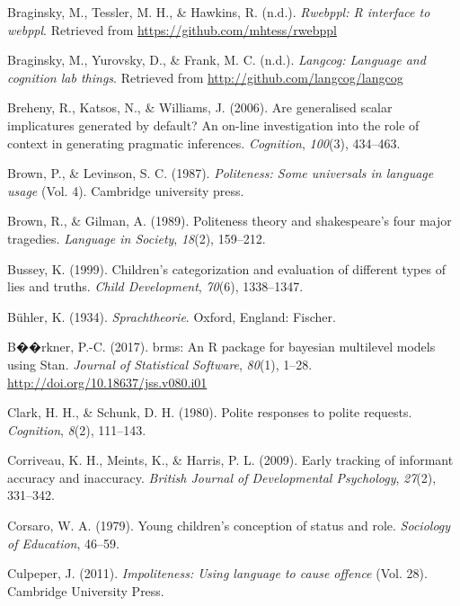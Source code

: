 \documentclass[oneside]{report}
\begin{document}
\hypertarget{ref-R-rwebppl}{}
Braginsky, M., Tessler, M. H., \& Hawkins, R. (n.d.). \emph{Rwebppl: R
interface to webppl}. Retrieved from
\url{https://github.com/mhtess/rwebppl}

\hypertarget{ref-R-langcog}{}
Braginsky, M., Yurovsky, D., \& Frank, M. C. (n.d.). \emph{Langcog:
Language and cognition lab things}. Retrieved from
\url{http://github.com/langcog/langcog}

\hypertarget{ref-breheny2006}{}
Breheny, R., Katsos, N., \& Williams, J. (2006). Are generalised scalar
implicatures generated by default? An on-line investigation into the
role of context in generating pragmatic inferences. \emph{Cognition},
\emph{100}(3), 434--463.

\hypertarget{ref-brown1987}{}
Brown, P., \& Levinson, S. C. (1987). \emph{Politeness: Some universals
in language usage} (Vol. 4). Cambridge university press.

\hypertarget{ref-brown1989}{}
Brown, R., \& Gilman, A. (1989). Politeness theory and shakespeare's
four major tragedies. \emph{Language in Society}, \emph{18}(2),
159--212.

\hypertarget{ref-bussey1999}{}
Bussey, K. (1999). Children's categorization and evaluation of different
types of lies and truths. \emph{Child Development}, \emph{70}(6),
1338--1347.

\hypertarget{ref-buhler1934}{}
Bühler, K. (1934). \emph{Sprachtheorie}. Oxford, England: Fischer.

\hypertarget{ref-R-brms}{}
B��rkner, P.-C. (2017). brms: An R package for bayesian multilevel
models using Stan. \emph{Journal of Statistical Software}, \emph{80}(1),
1--28. \url{http://doi.org/10.18637/jss.v080.i01}

\hypertarget{ref-clark1980}{}
Clark, H. H., \& Schunk, D. H. (1980). Polite responses to polite
requests. \emph{Cognition}, \emph{8}(2), 111--143.

\hypertarget{ref-corriveau2009}{}
Corriveau, K. H., Meints, K., \& Harris, P. L. (2009). Early tracking of
informant accuracy and inaccuracy. \emph{British Journal of
Developmental Psychology}, \emph{27}(2), 331--342.

\hypertarget{ref-corsaro1979}{}
Corsaro, W. A. (1979). Young children's conception of status and role.
\emph{Sociology of Education}, 46--59.

\hypertarget{ref-culpeper2011}{}
Culpeper, J. (2011). \emph{Impoliteness: Using language to cause
offence} (Vol. 28). Cambridge University Press.
\end{document}
